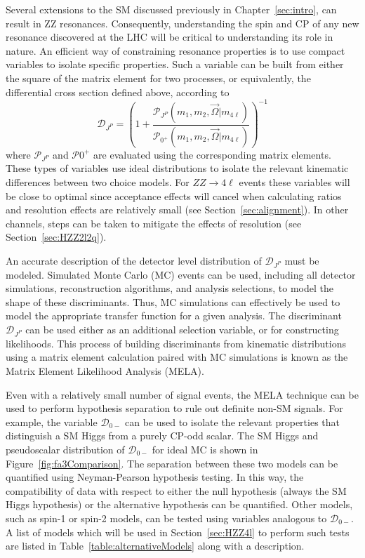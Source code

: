 Several extensions
to the SM discussed previously in Chapter~\ref{sec:intro}, can result 
in ZZ resonances.  
Consequently, understanding the spin and CP of any new resonance discovered 
at the LHC will be critical to understanding its role in nature.  
An efficient way of constraining resonance properties is to use 
compact variables to isolate specific properties.  Such a variable 
can be built from either the square of the matrix element for two 
processes, or equivalently, the differential cross section defined 
above, according to 
\begin{equation}
\mathscr{D}_{J^P} = \left(1+\frac{\mathscr{P}_{J^{P}}(m_1,m_2,\vec{\Omega}|m_{4\ell})}{\mathscr{P}_{0^+}(m_1,m_2,\vec{\Omega}|m_{4\ell})}\right)^{-1}
\label{eq:KD}
\end{equation}
where $\mathscr{P}_{J^P}$ and $\mathscr{P}0^+$ are evaluated using
the corresponding matrix elements.  These types of variables use
ideal distributions to isolate the relevant kinematic differences
between two choice models.  For $ZZ\to4\ell$ events these variables
will be close to optimal since acceptance effects will cancel when
calculating ratios and resolution effects are relatively small (see Section~\ref{sec:alignment}).  
In other channels, steps can be taken to mitigate the effects of 
resolution (see Section~\ref{sec:HZZ2l2q}).

An accurate description of the detector level distribution of 
$\mathscr{D}_{J^P}$ must be modeled.  Simulated Monte Carlo (MC)
events can be used, including all detector simulations, 
reconstruction algorithms, and analysis selections, to model the 
shape of these discriminants. Thus, MC simulations can effectively 
be used to model the appropriate 
transfer function for a given analysis.  The discriminant 
$\mathscr{D}_{J^P}$ can be used either as an additional selection 
variable, or for constructing likelihoods.
This process of building discriminants from kinematic distributions
using a matrix element calculation paired with MC simulations is 
known as the Matrix Element Likelihood Analysis (MELA).

Even with a relatively small number of signal events, the MELA 
technique can be used to perform hypothesis separation to rule 
out definite non-SM signals.  For example, the variable 
$\mathscr{D}_{0-}$ can be used to isolate the relevant properties 
that distinguish a SM Higgs from a purely CP-odd scalar.  The SM 
Higgs and pseudoscalar distribution of $\mathscr{D}_{0-}$ for ideal 
MC is shown in Figure~\ref{fig:fa3Comparison}.  The separation 
between these two models can be quantified using Neyman-Pearson 
hypothesis testing. 
In this way, the compatibility of data with respect to either the 
null hypothesis (always the SM Higgs hypothesis) or the alternative
hypothesis can be quantified.  Other models, such as spin-1 or 
spin-2 models, can be tested using variables analogous to 
$\mathscr{D}_{0-}$.
A list of models which will be used in Section~\ref{sec:HZZ4l} 
to perform such tests are listed in 
Table~\ref{table:alternativeModels} along with a description.  

